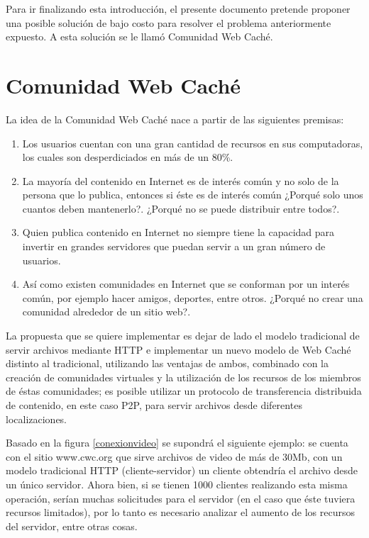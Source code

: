 Para ir finalizando esta introducción, el presente documento pretende proponer una posible solución de bajo costo para resolver el problema anteriormente expuesto. A esta solución se le llamó Comunidad Web Caché. 


\section{Comunidad Web Caché}

La idea de la Comunidad Web Caché nace a partir de las siguientes premisas:

\begin{enumerate}
\item Los usuarios cuentan con una gran cantidad de recursos en sus computadoras, los cuales son desperdiciados en más de un 80\%.
\item La mayoría del contenido en Internet es de interés común y no solo de la persona que lo publica, entonces si éste es de interés común ¿Porqué solo unos cuantos deben mantenerlo?. ¿Porqué no se puede distribuir entre todos?.
\item Quien publica contenido en Internet no siempre tiene la capacidad para invertir en grandes servidores que puedan servir a un gran número de usuarios.
\item Así como existen comunidades en Internet que se conforman por un interés común, por ejemplo hacer amigos, deportes, entre otros. ¿Porqué no crear una comunidad alrededor de un sitio web?.
\end{enumerate}

La propuesta que se quiere implementar es dejar de lado el modelo tradicional de servir archivos mediante HTTP e implementar un nuevo modelo de Web Caché distinto al tradicional, utilizando las ventajas de ambos, combinado con la creación de comunidades virtuales y la utilización de los recursos de los miembros de éstas comunidades; es posible utilizar un protocolo de transferencia distribuida de contenido, en este caso P2P, para servir archivos desde diferentes localizaciones.

Basado en la figura \ref{conexionvideo} se supondrá el siguiente ejemplo: se cuenta con el sitio www.cwc.org que sirve archivos de video de más de 30Mb, con un modelo tradicional HTTP (cliente-servidor) un cliente obtendría el archivo desde un único servidor. Ahora bien, si se tienen 1000 clientes realizando esta misma operación, serían muchas solicitudes para el servidor (en el caso que éste tuviera recursos limitados), por lo tanto es necesario analizar el aumento de los recursos del servidor, entre otras cosas. 

